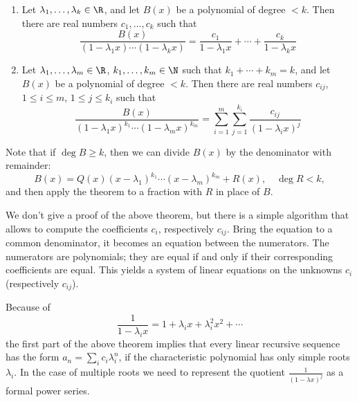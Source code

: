 \begin{page}
\setcounter{section}{2}
\setcounter{subsection}{3}
\setcounter{dfn}{11}
\label{portion:854}

\begin{thm}
\begin{enumerate}
\item
Let $\lambda_1, \ldots, \lambda_k \in \R$, and let $B(x)$ be a polynomial of degree $< k$.
Then there are real numbers $c_1, \ldots, c_k$ such that
\[
\frac{B(x)}{(1-\lambda_1 x) \cdots (1-\lambda_k x)} = \frac{c_1}{1-\lambda_1 x} + \cdots + \frac{c_k}{1-\lambda_k x}
\]
\item
Let $\lambda_1, \ldots, \lambda_m \in \R$, $k_1, \ldots, k_m \in \N$ such that $k_1 + \cdots + k_m = k$,
and let $B(x)$ be a polynomial of degree $< k$.
Then there are real numbers $c_{ij}$, $1 \le i \le m$, $1 \le j \le k_i$ such that
\[
\frac{B(x)}{(1-\lambda_1 x)^{k_1} \cdots (1-\lambda_m x)^{k_m}} = \sum_{i=1}^m \sum_{j=1}^{k_i} \frac{c_{ij}}{(1-\lambda_i x)^j}
\]
\end{enumerate}
\end{thm}

\end{page}

\begin{page}
\setcounter{section}{2}
\setcounter{subsection}{3}
\setcounter{dfn}{12}
\label{portion:857}

\begin{rem}
Note that if $\deg B \ge k$, then we can divide $B(x)$ by the denominator with remainder:
\[
B(x) = Q(x) (x-\lambda_1)^{k_1} \cdots (x-\lambda_m)^{k_m} + R(x), \quad \deg R < k,
\]
and then apply the theorem to a fraction with $R$ in place of $B$.
\end{rem}

\end{page}

\begin{page}
\setcounter{section}{2}
\setcounter{subsection}{4}
\setcounter{dfn}{12}
\label{portion:858}


We don't give a proof of the above theorem, but there is a simple algorithm that allows to compute the coefficients $c_i$, respectively $c_{ij}$.
Bring the equation to a common denominator, it becomes an equation between the numerators.
The numerators are polynomials; they are equal if and only if their corresponding coefficients are equal.
This yields a system of linear equations on the unknowns $c_i$ (respectively $c_{ij}$).

Because of
\[
\frac{1}{1-\lambda_i x} = 1 + \lambda_i x + \lambda_i^2 x^2 + \cdots
\]
the first part of the above theorem implies that every linear recursive sequence has the form $a_n = \sum_i c_i \lambda_i^n$,
if the characteristic polynomial has only simple roots $\lambda_i$.
In the case of multiple roots we need to represent the quotient $\frac{1}{(1-\lambda x)^j}$ as a formal power series.



\end{page}

